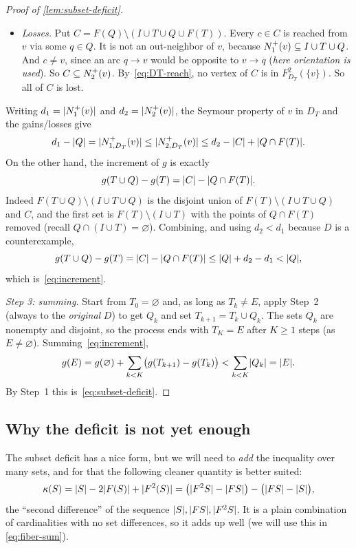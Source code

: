 \begin{proof}[Proof of \cref{lem:subset-deficit}]
\begin{itemize}[leftmargin=*]
\item \emph{Losses.} Put $C=F(Q)\setminus(I\cup T\cup Q\cup F(T))$. Every
$c\in C$ is reached from $v$ via some $q\in Q$. It is not an out-neighbor of
$v$, because $N^+_1(v)\subseteq I\cup T\cup Q$. And $c\ne v$, since an arc
$q\to v$ would be opposite to $v\to q$ (\emph{here orientation is used}).
So $C\subseteq N^+_2(v)$. By~\eqref{eq:DT-reach}, no vertex of $C$ is in
$F^2_{D_T}(\{v\})$. So all of $C$ is lost.
\end{itemize}
Writing $d_1=\lvert N^+_1(v)\rvert$ and $d_2=\lvert N^+_2(v)\rvert$, the Seymour property of
$v$ in $D_T$ and the gains/losses give
\[
 d_1-\lvert Q\rvert=\lvert N^+_{1,D_T}(v)\rvert\le\lvert N^+_{2,D_T}(v)\rvert\le d_2-\lvert C\rvert+\lvert Q\cap F(T)\rvert.
\]
On the other hand, the increment of $g$ is exactly
\begin{equation}\label{eq:g-increment}
 g(T\cup Q)-g(T)=\lvert C\rvert-\lvert Q\cap F(T)\rvert.
\end{equation}
Indeed $F(T\cup Q)\setminus(I\cup T\cup Q)$ is the disjoint union of
$F(T)\setminus(I\cup T\cup Q)$ and $C$, and the first set is
$F(T)\setminus(I\cup T)$ with the points of $Q\cap F(T)$ removed (recall
$Q\cap(I\cup T)=\varnothing$). Combining, and using $d_2<d_1$ because $D$ is a
counterexample,
\[
 g(T\cup Q)-g(T)=\lvert C\rvert-\lvert Q\cap F(T)\rvert\le\lvert Q\rvert+d_2-d_1<\lvert Q\rvert,
\]
which is~\eqref{eq:increment}.

\emph{Step 3: summing.} Start from $T_0=\varnothing$ and, as long as
$T_k\ne E$, apply Step~2 (always to the \emph{original} $D$) to get
$Q_k$ and set $T_{k+1}=T_k\cup Q_k$. The sets $Q_k$ are nonempty and
disjoint, so the process ends with $T_K=E$ after $K\ge1$ steps (as
$E\neq\varnothing$). Summing~\eqref{eq:increment},
\[
 g(E)=g(\varnothing)+\sum_{k<K}\bigl(g(T_{k+1})-g(T_k)\bigr)<\sum_{k<K}\lvert Q_k\rvert=\lvert E\rvert.
\]
By Step~1 this is~\eqref{eq:subset-deficit}.
\end{proof}

\subsection{Why the deficit is not yet enough}

The subset deficit has a nice form, but we will need to \emph{add} the
inequality over many sets, and for that the following cleaner quantity is
better suited:
\[
 \kappa(S)=\lvert S\rvert-2\lvert F(S)\rvert+\lvert F^2(S)\rvert
 =\bigl(\lvert F^2S\rvert-\lvert FS\rvert\bigr)-\bigl(\lvert FS\rvert-\lvert S\rvert\bigr),
\]
the ``second difference'' of the sequence $\lvert S\rvert,\lvert FS\rvert,\lvert F^2S\rvert$. It is
a plain combination of cardinalities with no set differences, so it adds
up well (we will use this in \cref{eq:fiber-sum}).

